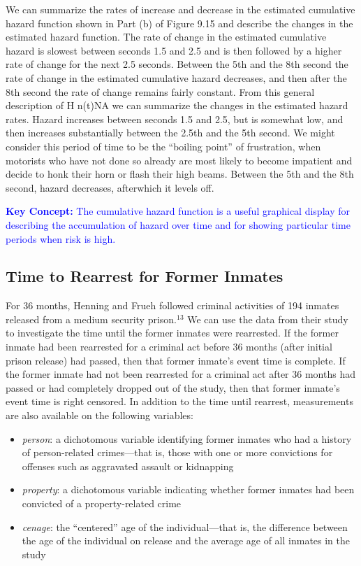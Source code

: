 \documentclass[
]{book}
\begin{document}
We can summarize the rates of increase and decrease in the estimated cumulative hazard function shown in Part (b) of Figure 9.15 and describe the changes in the estimated hazard function. The rate of
change in the estimated cumulative hazard is slowest between seconds 1.5 and 2.5 and is then followed by a higher rate of change for the next 2.5 seconds. Between the 5th and the 8th second the rate of change in
the estimated cumulative hazard decreases, and then after the 8th second the rate of change remains fairly constant. From this general description of H n(t)NA we can summarize the changes in the estimated hazard rates. Hazard increases between seconds 1.5 and 2.5, but is somewhat low, and then increases substantially between the 2.5th and the 5th second. We might consider this period of time to be the ``boiling point'' of frustration, when motorists who have not done so already are most likely to become impatient and decide to honk their horn or flash their high beams. Between the 5th and the 8th second, hazard decreases, afterwhich it levels off.

\textbf{\textcolor{blue}{Key Concept:}}
\textcolor{blue}{The cumulative hazard function is a useful graphical display for describing the accumulation of hazard
over time and for showing particular time periods when risk is high.}

\hypertarget{time-to-rearrest-for-former-inmates}{%
\subsection*{Time to Rearrest for Former Inmates}\label{time-to-rearrest-for-former-inmates}}

For 36 months, Henning and Frueh followed criminal activities of 194 inmates released from a medium security prison.\(^13\) We can use the data from their study to investigate the time until the former inmates were rearrested. If the former inmate had been rearrested for a criminal act before 36 months (after initial prison release) had passed, then that former inmate's event time is complete. If the former inmate had not been rearrested for a criminal act after 36 months had passed or had completely dropped out of the study, then that former inmate's event time is right censored. In addition to the time until rearrest, measurements are also available on the following variables:

\begin{itemize}
\item
  \emph{person}: a dichotomous variable identifying former inmates who had a history of person-related crimes---that is, those with one or more convictions for offenses such as aggravated assault or kidnapping
\item
  \emph{property}: a dichotomous variable indicating whether former inmates had been convicted of a property-related crime
\item
  \emph{cenage}: the ``centered'' age of the individual---that is, the difference between the age of the individual on release and the average age of all inmates in the study
\end{itemize}
\end{document}
